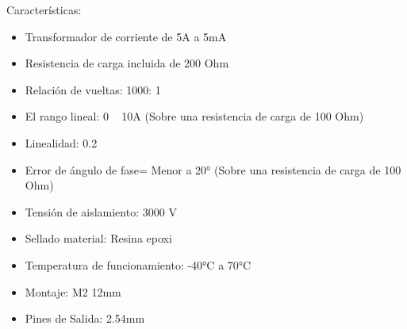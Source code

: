 Características:
\begin{itemize}

\item Transformador de corriente de 5A a 5mA
\item Resistencia de carga incluida de 200 Ohm
\item Relación de vueltas: 1000: 1
\item El rango lineal: 0 ~ 10A (Sobre una resistencia de carga de 100 Ohm)
\item Linealidad: 0.2%
\item Error de ángulo de fase= Menor a 20° (Sobre una resistencia de carga de 100 Ohm)
\item Tensión de aislamiento: 3000 V
\item Sellado material: Resina epoxi
\item Temperatura de funcionamiento: -40°C a 70°C
\item Montaje: M2 12mm
\item Pines de Salida: 2.54mm

\end{itemize}


